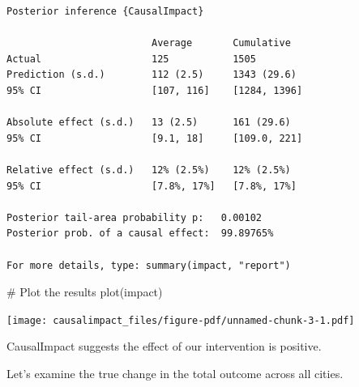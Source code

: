 \documentclass[
  letterpaper,
  DIV=11,
  numbers=noendperiod]{scrreprt}
\newenvironment{Shaded}{\begin{snugshade}}{\end{snugshade}}
\newcommand{\CommentTok}[1]{\textcolor[rgb]{0.37,0.37,0.37}{#1}}
\newcommand{\FunctionTok}[1]{\textcolor[rgb]{0.28,0.35,0.67}{#1}}
\newcommand{\NormalTok}[1]{\textcolor[rgb]{0.00,0.23,0.31}{#1}}
\begin{document}
\begin{verbatim}
Posterior inference {CausalImpact}

                         Average       Cumulative  
Actual                   125           1505        
Prediction (s.d.)        112 (2.5)     1343 (29.6) 
95% CI                   [107, 116]    [1284, 1396]
                                                   
Absolute effect (s.d.)   13 (2.5)      161 (29.6)  
95% CI                   [9.1, 18]     [109.0, 221]
                                                   
Relative effect (s.d.)   12% (2.5%)    12% (2.5%)  
95% CI                   [7.8%, 17%]   [7.8%, 17%] 

Posterior tail-area probability p:   0.00102
Posterior prob. of a causal effect:  99.89765%

For more details, type: summary(impact, "report")
\end{verbatim}

\begin{Shaded}
\begin{Highlighting}[]
\CommentTok{\# Plot the results}
\FunctionTok{plot}\NormalTok{(impact)}
\end{Highlighting}
\end{Shaded}

\texttt{[image: causalimpact\_files/figure-pdf/unnamed-chunk-3-1.pdf]}

CausalImpact suggests the effect of our intervention is positive.

Let's examine the true change in the total outcome across all cities.
\end{document}
